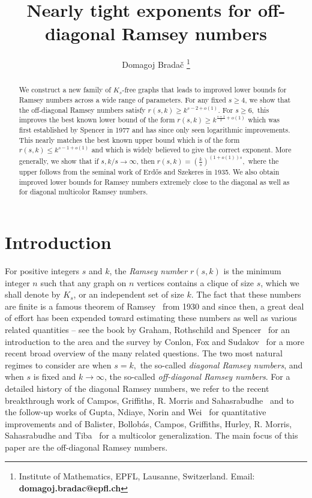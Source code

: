 \documentclass{article}
\title{Nearly tight exponents for off-diagonal Ramsey numbers}
\author{Domagoj Brada\v{c} \thanks{Institute of Mathematics, EPFL, Lausanne, Switzerland. Email: \textbf{domagoj.bradac@epfl.ch}}}
\date{}
\theoremstyle{plain}
\theoremstyle{definition}
\begin{document}
\maketitle

\begin{abstract}
    We construct a new family of $K_s$-free graphs that leads to improved lower bounds for Ramsey numbers across a wide range of parameters. For any fixed $s \ge 4$, we show that the off-diagonal Ramsey numbers satisfy $r(s, k) \ge k^{s-2 + o(1)}.$ For $s \ge 6,$ this improves the best known lower bound of the form $r(s, k) \ge k^{\frac{s+1}{2} + o(1)}$ which was first established by Spencer in 1977 and has since only seen logarithmic improvements. This nearly matches the best known upper bound which is of the form $r(s, k) \le k^{s-1 + o(1)}$ and which is widely believed to give the correct exponent. More generally, we show that if $s, k/s \rightarrow \infty$, then $r(s, k) = \left(\frac{k}{s}\right)^{(1+o(1)) s},$ where the upper follows from the seminal work of Erd\H{o}s and Szekeres in 1935. We also obtain improved lower bounds for Ramsey numbers extremely close to the diagonal as well as for diagonal multicolor Ramsey numbers.
\end{abstract}

\section{Introduction}
For positive integers $s$ and $k$, the \emph{Ramsey number} $r(s, k)$ is the minimum integer $n$ such that any graph on $n$ vertices contains a clique of size $s$, which we shall denote by $K_s$, or an independent set of size $k$. The fact that these numbers are finite is a famous theorem of Ramsey~\cite{ramsey} from 1930 and since then, a great deal of effort has been expended toward estimating these numbers as well as various related quantities -- see the book by Graham, Rothschild and Spencer~\cite{graham-rothschild-spencer} for an introduction to the area and the survey by Conlon, Fox and Sudakov~\cite{CFSsurvey} for a more recent broad overview of the many related questions. The two most natural regimes to consider are when $s = k,$ the so-called \emph{diagonal Ramsey numbers}, and when $s$ is fixed and $k \rightarrow \infty$, the so-called \emph{off-diagonal Ramsey numbers}. For a detailed history of the diagonal Ramsey numbers, we refer to the recent breakthrough work of Campos, Griffiths, R. Morris and Sahasrabudhe~\cite{CGMS} and to the follow-up works of Gupta, Ndiaye, Norin and Wei~\cite{gupta} for quantitative improvements and of Balister, Bollob\'{a}s, Campos, Griffiths, Hurley, R. Morris, Sahasrabudhe and Tiba~\cite{balister} for a multicolor generalization. The main focus of this paper are the off-diagonal Ramsey numbers.
\end{document}

